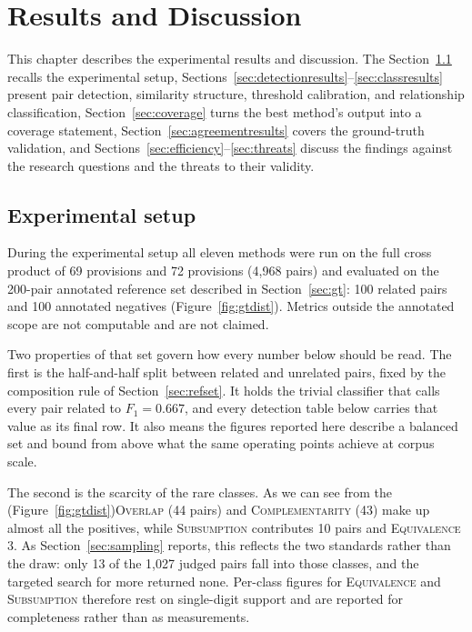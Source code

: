  \chapter{Results and Discussion}\label{ch:results}

This chapter describes the experimental results and discussion. The Section~\ref{sec:setup} recalls
the experimental setup, Sections~\ref{sec:detectionresults}--\ref{sec:classresults} present
pair detection, similarity structure, threshold calibration, and relationship
classification, Section~\ref{sec:coverage} turns the best method's output into a
coverage statement, Section~\ref{sec:agreementresults} covers the ground-truth
validation, and Sections~\ref{sec:efficiency}--\ref{sec:threats} discuss the
findings against the research questions and the threats to their validity.

\section{Experimental setup}\label{sec:setup}

During the experimental setup all eleven methods were run on the full cross product of 69 \standardA{}
provisions and 72 \standardB{} provisions (4{,}968 pairs) and evaluated on the
200-pair annotated reference set described in Section~\ref{sec:gt}: 100 related
pairs and 100 annotated negatives (Figure~\ref{fig:gtdist}). Metrics outside the
annotated scope are not computable and are not claimed.

Two properties of that set govern how every number below should be read. The
first is the half-and-half split between related and unrelated pairs, fixed by
the composition rule of Section~\ref{sec:refset}. It holds the trivial classifier
that calls every pair related to $F_1 = 0.667$, and every detection table below
carries that value as its final row. It also means the figures reported here
describe a balanced set and bound from above what the same operating points
achieve at corpus scale.

The second is the scarcity of the rare classes. As we can see from the (Figure~\ref{fig:gtdist})\textsc{Overlap} (44 pairs) and \textsc{Complementarity} (43) make up almost all the positives, while
\textsc{Subsumption} contributes 10 pairs and \textsc{Equivalence} 3. As
Section~\ref{sec:sampling} reports, this reflects the two standards rather than
the draw: only 13 of the 1{,}027 judged pairs fall into those classes, and the
targeted search for more returned none. Per-class figures for \textsc{Equivalence}
and \textsc{Subsumption} therefore rest on single-digit support and are reported
for completeness rather than as measurements.

